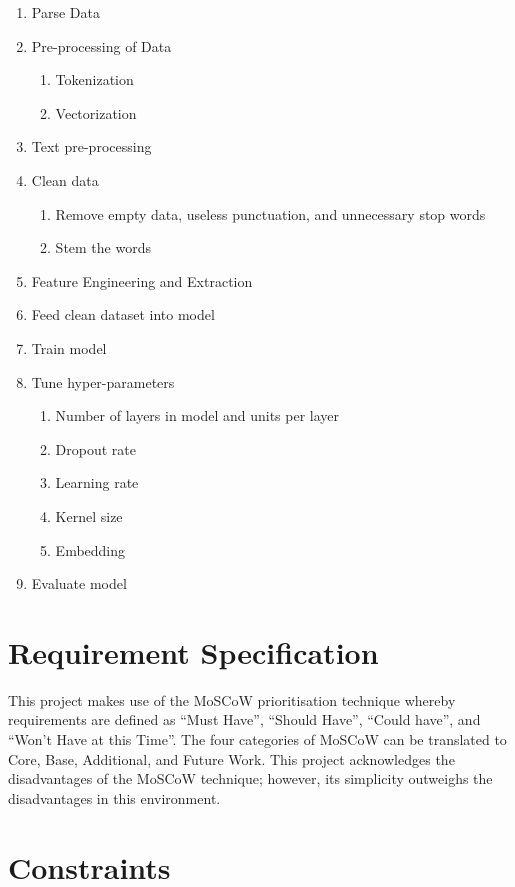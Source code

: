 \begin{enumerate}
    \item Parse Data
    \item Pre-processing of Data
    \begin{enumerate}
        \item Tokenization
        \item Vectorization
    \end{enumerate}
\item Text pre-processing
\item Clean data
    \begin{enumerate}
        \item Remove empty data, useless punctuation, and unnecessary stop words
        \item Stem the words
    \end{enumerate}
\item Feature Engineering and Extraction
\item Feed clean dataset into model
\item Train model
\item Tune hyper-parameters
    \begin{enumerate}
        \item Number of layers in model and units per layer
        \item Dropout rate
        \item Learning rate
        \item Kernel size
        \item Embedding
    \end{enumerate}
\item Evaluate model
\end{enumerate}

\section{Requirement Specification}

This project makes use of the MoSCoW prioritisation technique whereby requirements are defined as “Must Have”, “Should Have”, “Could have”, and “Won’t Have at this Time”. The four categories of MoSCoW can be translated to Core, Base, Additional, and Future Work. This project acknowledges the disadvantages of the MoSCoW technique; however, its simplicity outweighs the disadvantages in this environment.

\section{Constraints}

